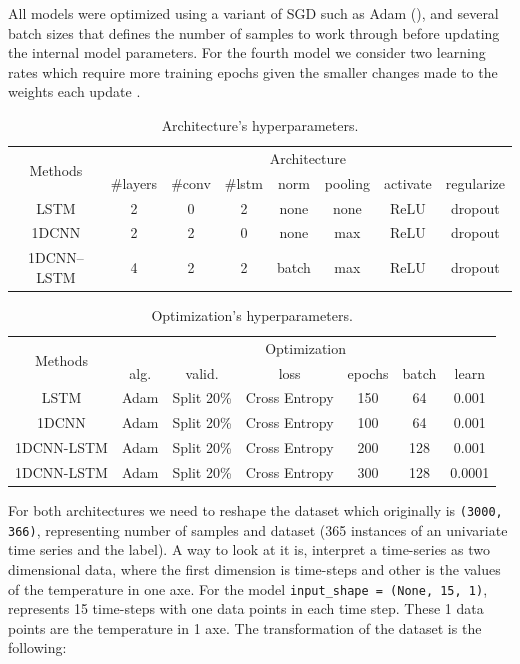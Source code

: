 All models were optimized using a variant of SGD such as Adam (\cite{Kingma2015}), and several batch sizes that defines the number of samples to work through before updating the internal model parameters. For the fourth model we consider two learning rates which require more training epochs given the smaller changes made to the weights each update \cite{}.

\begin{table}[h]
	\centering
	\tiny
	\begin{tabular}{|c|c|c|c|c|c|c|c|}
		\hline
		\multirow{2}{*}{Methods} & \multicolumn{7}{c|}{Architecture} \\
		\cline{2-8}
		& \#layers & \#conv & \#lstm & norm & pooling & activate & regularize \\
		\cline{2-8}
		\hline
		LSTM & 2 & 0 & 2 & none & none & ReLU & dropout \\
		\hline
		1DCNN & 2 & 2 & 0 & none & max & ReLU & dropout \\
		\hline
		1DCNN--LSTM & 4 & 2 & 2 & batch & max & ReLU & dropout  \\
		\hline
	\end{tabular}
	\caption{Architecture’s hyperparameters.}
	\label{Table:HyperparametersNN}
\end{table}

\begin{table}[h]
	\centering
	\tiny
	\begin{tabular}{|c|c|c|c|c|c|c|}
		\hline
		\multirow{2}{*}{Methods} & \multicolumn{6}{c|}{Optimization} \\
		\cline{2-7}
		& alg. & valid. & loss & epochs & batch & learn \\
		\cline{2-7}
		\hline
		LSTM & Adam & Split 20\% & Cross Entropy & 150 & 64 & 0.001 \\
		\hline
		1DCNN & Adam & Split 20\% & Cross Entropy & 100 & 64 & 0.001 \\
		\hline
		1DCNN-LSTM & Adam & Split 20\% & Cross Entropy & 200 & 128 & 0.001 \\
		\hline
		1DCNN-LSTM & Adam & Split 20\% & Cross Entropy & 300 & 128 & 0.0001 \\
		\hline
	\end{tabular}
	\caption{Optimization’s hyperparameters.}
	\label{Table:OptimizationNN}
\end{table}

For both architectures we need to reshape the dataset which originally is \texttt{(3000, 366)}, representing number of samples and dataset (365 instances of an univariate time series and the label). A way to look at it is, interpret a time-series as two dimensional data, where the first dimension is time-steps and other is the values of the  temperature in one axe. For the model \texttt{input\_shape = (None, 15, 1)}, represents 15 time-steps with one data points in each time step. These 1 data points are the temperature in 1 axe. The transformation of the dataset is the following:

